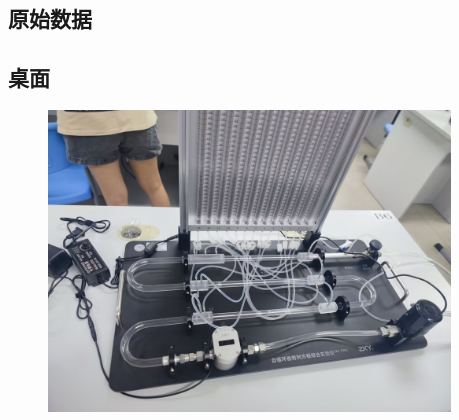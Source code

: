 \documentclass[dvipsnames, svgnames,a4paper,11pt]{article}
\begin{document}
\subsection*{原始数据}

\subsection*{桌面}
\begin{figure}[!h]
	\includegraphics[width=0.95\textwidth]{实验2桌面.jpg}
\end{figure}
\end{document}
